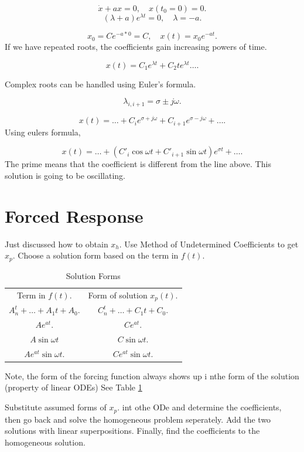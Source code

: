 \documentclass[12pt, a4paper]{report}
\begin{document}
  \[
      \dot x + ax = 0, \quad x(t_0 = 0) = 0
    .\]
  \[
      (\lambda + a) e^{\lambda t} = 0, \quad \lambda = -a
    .\]

  \[
      x_0 = C e^{-a*0} = C, \quad x(t) = x_0 e^{-at}
    .\]
  If we have repeated roots, the coefficients gain increasing powers of time.

  \[
      x(t) = C_1 e^{\lambda t} + C_2 t e^{\lambda t} \ldots
    .\]

  Complex roots can be handled using Euler's formula.

  \[
      \lambda_{i, i+1} = \sigma \pm j\omega
    .\]

  \[
      x(t) = \ldots + C_i e^{\sigma + j\omega} + C_{i + 1} e^{\sigma - j\omega} + \ldots
    .\]
  Using eulers formula,

  \[
      x(t) = \ldots + \left( C'_i \cos \omega t + C'_{i+1} \sin \omega t \right) e^{\sigma t} + \ldots
    .\]
  The prime means that the coefficient is different from the line above. This solution is going to be oscillating.

  \section{Forced Response}

  Just discussed how to obtain $ x_h. $ Use Method of Undetermined Coefficients to get $ x_p. $ Choose a solution form based on the term in $ f(t). $

  \begin{table}
    \caption{Solution Forms}
    \centering
    \begin{tabular}{c  c}
      Term in $ f(t). $ & Form of solution $ x_p(t). $ \\
      $ A_n^t + \ldots + A_1 t + A_0. $  & $ C_n^t + \ldots + C_1 t + C_0. $\\
      $ Ae^{at}. $ & $ Ce^{at}. $ \\
      $ A\sin \omega t$ & $ C\sin \omega t . $ \\
      $ Ae^{at}\sin \omega t. $ & $ Ce^{at}\sin \omega t. $
    \end{tabular}
    \label{tab:forcedresponse}

  \end{table}
  Note, the form of the forcing function always shows up i nthe form of the solution (property of linear ODEs) See Table \ref{tab:forcedresponse}

  Substitute assumed forms of $ x_p. $ int othe ODe and determine the coefficients, then go back and solve the homogeneous problem seperately. Add the two solutions with linear superpositions. Finally, find the coefficients to the homogeneous solution.
\end{document}
